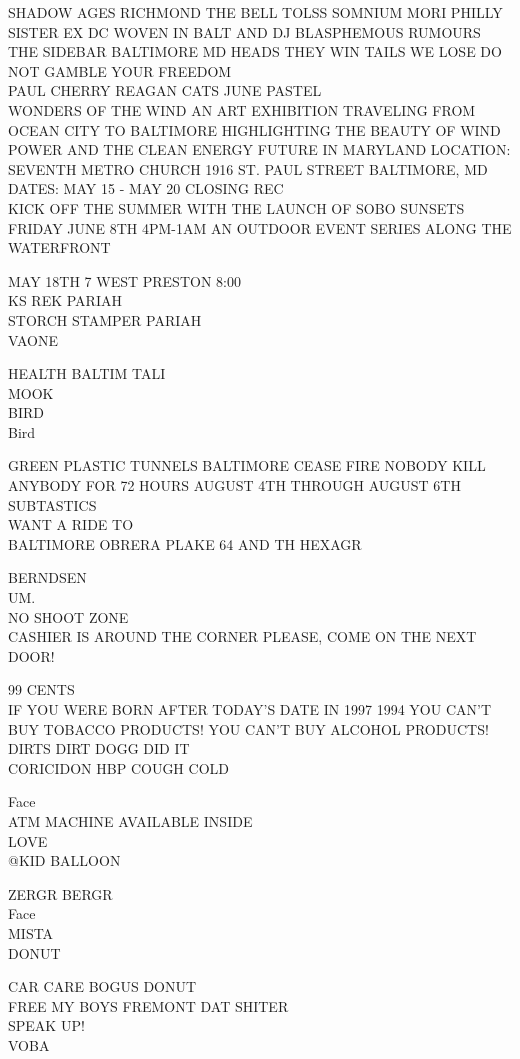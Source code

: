 \documentclass[10pt,letterpaper]{article}
\begin{document}
SHADOW AGES RICHMOND THE BELL TOLSS SOMNIUM MORI PHILLY SISTER EX DC WOVEN IN BALT AND DJ BLASPHEMOUS RUMOURS THE SIDEBAR BALTIMORE MD HEADS THEY WIN TAILS WE LOSE DO NOT GAMBLE YOUR FREEDOM\\
PAUL CHERRY REAGAN CATS JUNE PASTEL\\
WONDERS OF THE WIND AN ART EXHIBITION TRAVELING FROM OCEAN CITY TO BALTIMORE HIGHLIGHTING THE BEAUTY OF WIND POWER AND THE CLEAN ENERGY FUTURE IN MARYLAND LOCATION: SEVENTH METRO CHURCH 1916 ST. PAUL STREET BALTIMORE, MD DATES: MAY 15 {-} MAY 20 CLOSING REC\\
KICK OFF THE SUMMER WITH THE LAUNCH OF SOBO SUNSETS FRIDAY JUNE 8TH 4PM{-}1AM AN OUTDOOR EVENT SERIES ALONG THE WATERFRONT

MAY 18TH 7 WEST PRESTON 8:00\\
KS REK PARIAH\\
STORCH STAMPER PARIAH\\
VAONE

HEALTH BALTIM TALI\\
MOOK\\
BIRD\\
Bird

GREEN PLASTIC TUNNELS BALTIMORE CEASE FIRE NOBODY KILL ANYBODY FOR 72 HOURS AUGUST 4TH THROUGH AUGUST 6TH\\
SUBTASTICS\\
WANT A RIDE TO\\
BALTIMORE OBRERA PLAKE 64 AND TH HEXAGR

BERNDSEN\\
UM.\\
NO SHOOT ZONE\\
CASHIER IS AROUND THE CORNER PLEASE, COME ON THE NEXT DOOR!

99 CENTS\\
IF YOU WERE BORN AFTER TODAY'S DATE IN 1997 1994 YOU CAN'T BUY TOBACCO PRODUCTS!  YOU CAN'T BUY ALCOHOL PRODUCTS!\\
DIRTS DIRT DOGG DID IT\\
CORICIDON HBP COUGH COLD

Face\\
ATM MACHINE AVAILABLE INSIDE\\
LOVE\\
@KID BALLOON

ZERGR BERGR\\
Face\\
MISTA\\
DONUT

CAR CARE BOGUS DONUT\\
FREE MY BOYS FREMONT DAT SHITER\\
SPEAK UP!\\
VOBA
\end{document}
